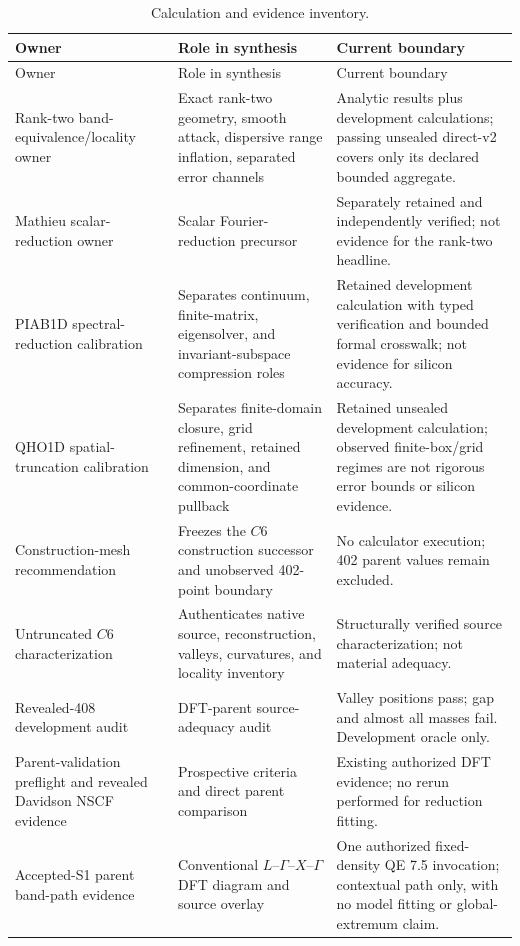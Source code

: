 \documentclass[11pt]{article}
\theoremstyle{definition}
\begin{document}
\small
\begin{longtable}{@{}p{}p{}p{}@{}}
\caption{Calculation and evidence inventory.}\label{tab:inventory}\\
\toprule
Owner & Role in synthesis & Current boundary\\
\midrule
\endfirsthead
\toprule
Owner & Role in synthesis & Current boundary\\
\midrule
\endhead
Rank-two band-equivalence/locality owner
& Exact rank-two geometry, smooth attack, dispersive range inflation, separated error channels
& Analytic results plus development calculations; passing unsealed direct-v2 covers only its declared bounded aggregate.\\
Mathieu scalar-reduction owner
& Scalar Fourier-reduction precursor
& Separately retained and independently verified; not evidence for the rank-two headline.\\
PIAB1D spectral-reduction calibration
& Separates continuum, finite-matrix, eigensolver, and invariant-subspace compression roles
& Retained development calculation with typed verification and bounded formal crosswalk; not evidence for silicon accuracy.\\
QHO1D spatial-truncation calibration
& Separates finite-domain closure, grid refinement, retained dimension, and common-coordinate pullback
& Retained unsealed development calculation; observed finite-box/grid regimes are not rigorous error bounds or silicon evidence.\\
Construction-mesh recommendation
& Freezes the $C6$ construction successor and unobserved 402-point boundary
& No calculator execution; 402 parent values remain excluded.\\
Untruncated $C6$ characterization
& Authenticates native source, reconstruction, valleys, curvatures, and locality inventory
& Structurally verified source characterization; not material adequacy.\\
Revealed-408 development audit
& DFT-parent source-adequacy audit
& Valley positions pass; gap and almost all masses fail.  Development oracle only.\\
Parent-validation preflight and revealed Davidson NSCF evidence
& Prospective criteria and direct parent comparison
& Existing authorized DFT evidence; no rerun performed for reduction fitting.\\
Accepted-S1 parent band-path evidence
& Conventional $L$--$\Gamma$--$X$--$\Gamma$ DFT diagram and source overlay
& One authorized fixed-density QE 7.5 invocation; contextual path only, with no model fitting or global-extremum claim.\\

\end{longtable}
\end{document}

